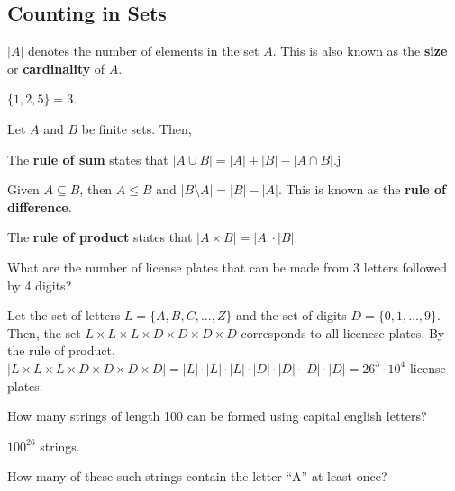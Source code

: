 
\subsection{Counting in Sets}

\begin{notation}
	\( |A| \) denotes the number of elements in the set \( A \). This is also known as the \textbf{size} or \textbf{cardinality} of \( A \).
\end{notation}

\begin{eg}
	\( \{1,2,5\} =3  \).
\end{eg}

Let \( A \) and \( B \) be finite sets. Then, 

\begin{theorem}
	The \textbf{rule of sum} states that \( |A \cup B| = |A| + |B| - |A \cap B| \).j
\end{theorem}

\begin{theorem}
	Given \( A \subseteq B \), then \( A \le B \) and \( |B \setminus A| = |B| - |A| \). This is known as the \textbf{rule of difference}.
\end{theorem}

\begin{theorem}
	The \textbf{rule of product} states that \( |A \times B| = |A| \cdot |B| \).
\end{theorem}

\begin{eg}
	What are the number of license plates that can be made from 3 letters followed by 4 digits?
\end{eg}

Let the set of letters \( L = \{A,B,C, \ldots,Z\}   \) and the set of digits \( D = \{0,1,\ldots ,9\}   \). Then, the set \( L \times L \times L \times D \times D \times D \times D \) corresponds to all licencse plates. By the rule of product, \( |L \times L \times L \times D \times D \times D \times D| = |L| \cdot |L| \cdot |L| \cdot |D| \cdot |D| \cdot |D| \cdot |D| = 26^3 \cdot 10^4 \) license plates.

\begin{eg}
	How many strings of length 100 can be formed using capital english letters?
\end{eg}

\( 100^26 \) strings.

\begin{eg}
	How many of these such strings contain the letter ``A'' at least once?
\end{eg}

